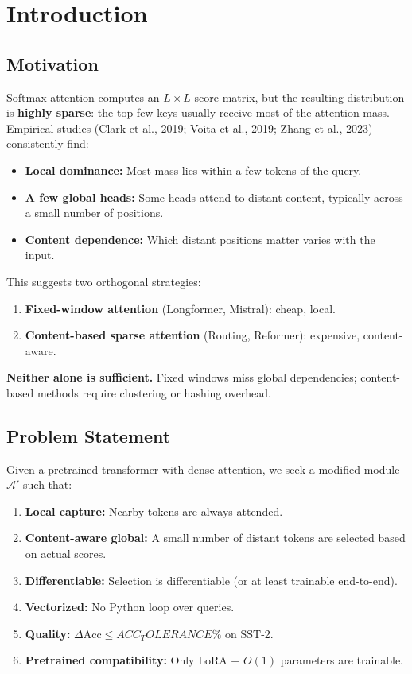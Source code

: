 
\section{Introduction}

\subsection{Motivation}

Softmax attention computes an $L \times L$ score matrix, but the resulting 
distribution is \textbf{highly sparse}: the top few keys usually receive most 
of the attention mass. Empirical studies (Clark et al., 2019; Voita et al., 
2019; Zhang et al., 2023) consistently find:

\begin{itemize}
\item \textbf{Local dominance:} Most mass lies within a few tokens of the query.
\item \textbf{A few global heads:} Some heads attend to distant content, typically
  across a small number of positions.
\item \textbf{Content dependence:} Which distant positions matter varies with the
  input.

\end{itemize}
This suggests two orthogonal strategies:

\begin{enumerate}
\item \textbf{Fixed-window attention} (Longformer, Mistral): cheap, local.
\item \textbf{Content-based sparse attention} (Routing, Reformer): expensive,
  content-aware.

\end{enumerate}
\textbf{Neither alone is sufficient.} Fixed windows miss global dependencies; 
content-based methods require clustering or hashing overhead.

\subsection{Problem Statement}

Given a pretrained transformer with dense attention, we seek a modified 
module $\mathcal{A}'$ such that:

\begin{enumerate}
\item \textbf{Local capture:} Nearby tokens are always attended.
\item \textbf{Content-aware global:} A small number of distant tokens are selected
  based on actual scores.
\item \textbf{Differentiable:} Selection is differentiable (or at least
  trainable end-to-end).
\item \textbf{Vectorized:} No Python loop over queries.
\item \textbf{Quality:} $\Delta\text{Acc} \leq {{ACC_TOLERANCE}}\%$ on SST-2.
\item \textbf{Pretrained compatibility:} Only LoRA + $O(1)$ parameters are trainable.

\end{enumerate}
